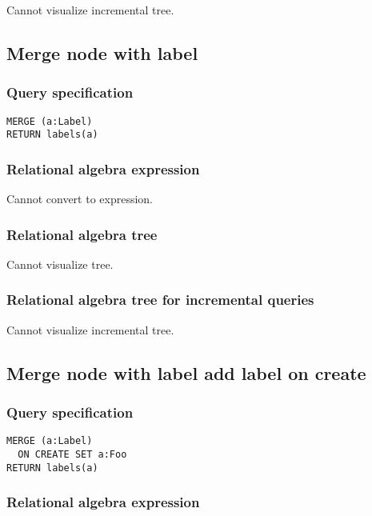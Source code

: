 Cannot visualize incremental tree.

\subsection{Merge node with label}

\subsubsection*{Query specification}

\begin{lstlisting}
MERGE (a:Label)
RETURN labels(a)
\end{lstlisting}

\subsubsection*{Relational algebra expression}

Cannot convert to expression.

\subsubsection*{Relational algebra tree}

Cannot visualize tree.

\subsubsection*{Relational algebra tree for incremental queries}

Cannot visualize incremental tree.

\subsection{Merge node with label add label on create}

\subsubsection*{Query specification}

\begin{lstlisting}
MERGE (a:Label)
  ON CREATE SET a:Foo
RETURN labels(a)
\end{lstlisting}

\subsubsection*{Relational algebra expression}

